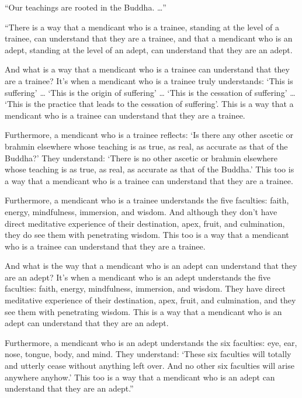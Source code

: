\documentclass[12pt,openany]{book}%
\begin{document}
“Our teachings are rooted in the Buddha. …” 

“There is a way that a mendicant who is a trainee, standing at the level of a trainee, can understand that they are a trainee, and that a mendicant who is an adept, standing at the level of an adept, can understand that they are an adept. 

And what is a way that a mendicant who is a trainee can understand that they are a trainee? It’s when a mendicant who is a trainee truly understands: ‘This is suffering’ … ‘This is the origin of suffering’ … ‘This is the cessation of suffering’ … ‘This is the practice that leads to the cessation of suffering’. This is a way that a mendicant who is a trainee can understand that they are a trainee. 

Furthermore, a mendicant who is a trainee reflects: ‘Is there any other ascetic or brahmin elsewhere whose teaching is as true, as real, as accurate as that of the Buddha?’ They understand: ‘There is no other ascetic or brahmin elsewhere whose teaching is as true, as real, as accurate as that of the Buddha.’ This too is a way that a mendicant who is a trainee can understand that they are a trainee. 

Furthermore, a mendicant who is a trainee understands the five faculties: faith, energy, mindfulness, immersion, and wisdom. And although they don’t have direct meditative experience of their destination, apex, fruit, and culmination, they do see them with penetrating wisdom. This too is a way that a mendicant who is a trainee can understand that they are a trainee. 

And what is the way that a mendicant who is an adept can understand that they are an adept? It’s when a mendicant who is an adept understands the five faculties: faith, energy, mindfulness, immersion, and wisdom. They have direct meditative experience of their destination, apex, fruit, and culmination, and they see them with penetrating wisdom. This is a way that a mendicant who is an adept can understand that they are an adept. 

Furthermore, a mendicant who is an adept understands the six faculties: eye, ear, nose, tongue, body, and mind. They understand: ‘These six faculties will totally and utterly cease without anything left over. And no other six faculties will arise anywhere anyhow.’ This too is a way that a mendicant who is an adept can understand that they are an adept.” 
\end{document}
